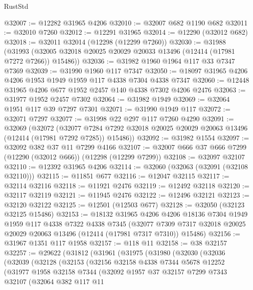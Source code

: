\begin{lexlean}{RustStd}
\begin{coremodule}
{\begin{coremodule}
{{{{{{{{{{{{{{{{{{{{{{{{{{{{{{{{{{{{{{{{{{{{{{{{{{@32007 := @12282 @31965 @4206
@32010 := @32007 @682 @1190 @682
@32011 := @32010 @7260
@32012 := @12291 @31965
@32014 := @12290 (@32012 @682)
@32018 := @32011 @32014 (@12298 (@12299 @7260))
@32030 := @31988
    (@31993 (@32005 @32018 @20025 @20029 @20033 @13496 (@12414 (@17981 @7272 @7266)) @15486))
@32036 := @31982 @1960 @1964 @117 @33 @7347 @7369
@32039 := @31990 @1960 @117 @7347
@32050 := @18097 @31965 @4206 @4206 @1953 @1949 @1959 @117 @4338 @7304 @4338 @7347
@32060 := @12448 @31965 @4206 @677 @1952 @2457 @140 @4338 @7302 @4206 @2476
@32063 := @31977 @1952 @2457 @7302
@32064 := @31982 @1949
@32069 := @32064 @1951 @117 @39 @7297 @7301
@32071 := @31990 @1949 @117
@32072 := @32071 @7297
@32077 := @31998 @22 @297 @117 @7260 @4290
@32091 := @32069
    (@32072
      (@32077 @7284 @7292 @32018 @20025 @20029 @20063 @13496 (@12414 (@17981 @7292 @7285)) @15486))
@32092 := @31982 @1554
@32097 := @32092 @382 @37 @11 @7299 @4166
@32107 := @32007 @666 @37 @666 @7299 (@12290 (@32012 @666)) (@12298 (@12299 @7299))
@32108 := @32097 @32107
@32110 := @12392 @31965 @4206
@32114 := @32060 (@32063 (@32091 (@32108 @32110)))
@32115 := @11851 @677
@32116 := @12047 @32115
@32117 := @32114 @32116
@32118 := @11921 @2476
@32119 := @12492 @32118
@32120 := @32117 @32119
@32121 := @11945 @2476
@32122 := @12496 @32121
@32123 := @32120 @32122
@32125 := @12501 (@12503 @677)
@32128 := @32050 (@32123 @32125 @15486)
@32153 := @18132
    @31965
    @4206
    @4206
    @18136
    @7304
    @1949
    @1959
    @117
    @4338
    @7322
    @4338
    @7345
    (@32077 @7309 @7317 @32018 @20025 @20029 @20063 @13496 (@12414 (@17981 @7317 @7310)) @15486)
@32156 := @31967 @1351 @117 @1958
@32157 := @118 @11
@32158 := @38 @32157
@32257 := @29622
    (@31812
      (@31961
        (@31975
          (@31980
            (@32030
              (@32036
                (@32039
                  (@32128
                    (@32153
                      (@32156
                        @32158
                        @4338
                        @7344
                        @5678
                        @12252
                        (@31977
                          @1958
                          @32158
                          @7344
                          (@32092
                            @1957
                            @37
                            @32157
                            @7299
                            @7343
                            @32107
                            (@32064
                              @382
                              @117
                              @11
}}}}}}}}}}}}}}}}}}}}}}}}}}}}}}}}}}}}}}}}}}}}}}}}}}
\end{coremodule}}
\end{coremodule}
\end{lexlean}
